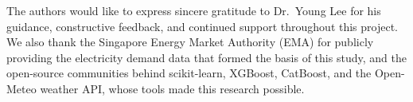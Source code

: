 
The authors would like to express sincere gratitude to Dr.\ Young Lee for his guidance, constructive feedback, and continued support throughout this project. We also thank the Singapore Energy Market Authority (EMA) for publicly providing the electricity demand data that formed the basis of this study, and the open-source communities behind scikit-learn, XGBoost, CatBoost, and the Open-Meteo weather API, whose tools made this research possible.

\afterpreface